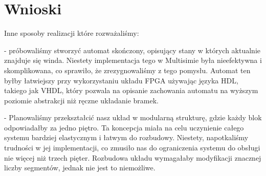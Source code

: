 \documentclass[a4paper]{article}
\begin{document}
\section{Wnioski}
Inne sposoby realizacji które rozważaliśmy:

    - próbowaliśmy stworzyć automat skończony, opisujący stany w których aktualnie znajduje się winda. 
    Niestety implementacja tego w Multisimie była nieefektywna i 
    skomplikowana, co sprawiło, że zrezygnowaliśmy z tego pomysłu.
    Automat ten byłby łatwiejszy przy wykorzystaniu układu FPGA używając języka HDL,
    takiego jak VHDL, który pozwala na opisanie zachowania automatu na wyższym poziomie abstrakcji 
    niż ręczne układanie bramek. 


    - Planowaliśmy przekształcić nasz układ w modularną strukturę, 
gdzie każdy blok odpowiadałby za jedno piętro. 
Ta koncepcja miała na celu uczynienie całego systemu bardziej elastycznym i 
łatwym do rozbudowy. Niestety, napotkaliśmy trudności w jej implementacji, 
co zmusiło nas do ograniczenia systemu do obsługi nie więcej niż trzech pięter. 
Rozbudowa układu wymagałaby modyfikacji znacznej liczby segmentów, jednak nie jest to niemożliwe. 
\end{document}
